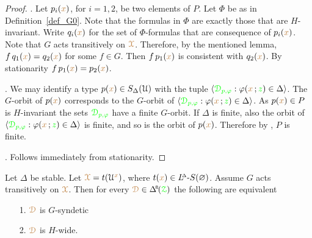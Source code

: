 \begin{proof}
  .
  Let $p_i({\color{brown} x})$, for $i=1,2$, be two elements of $P$.
  Let $\Phi$ be as in Definition~\ref{def_G0}.
  Note that the formulas in $\Phi$ are exactly those that are $H$-invariant.
  Write $q_i({\color{brown} x})$ for the set of $\Phi$-formulas that are consequence of $p_i({\color{brown} x})$.
  Note that $G$ acts transitively on ${\color{brown}\EuScript X}$.
  Therefore, by the mentioned lemma, $f\,q_1({\color{brown} x})=q_2({\color{brown} x})$ for some $f\in G$.
  Then $f\,p_1({\color{brown} x})$ is consistent with $q_2({\color{brown} x})$.
  By stationarity $f\,p_1({\color{brown} x})=p_2({\color{brown} x})$.

  .
  We may identify a type $p({\color{brown} x})\in S_\Delta(\EuScript U)$ with the tuple $\langle{\color{green}\EuScript D_{p,\varphi}}:\varphi({\color{brown} x}\,;{\color{green} z})\in\Delta\rangle$.
  The $G$-orbit of $p({\color{brown} x})$ corresponds to the $G$-orbit of $\langle{\color{green}\EuScript D_{p,\varphi}}:\varphi({\color{brown} x}\,;{\color{green} z})\in\Delta\rangle$.
  As $p({\color{brown} x})\in P$ is $H$-invariant the sets ${\color{green}\EuScript D_{p,\varphi}}$ have a finite $G$-orbit.
  If $\Delta$ is finite, also the orbit of $\langle{\color{green}\EuScript D_{p,\varphi}}:\varphi({\color{brown} x}\,;{\color{green} z})\in\Delta\rangle$ is finite, and so is the orbit of $p({\color{brown} x})$.
  Therefore by , $P$ is finite.

  .
  Follows immediately from stationarity.
\end{proof}

\begin{theorem}\label{thm_Gsyndetic_thick}
  Let $\Delta$ be stable.
  Let ${\color{brown}\EuScript X}=t(\EuScript U^{\color{brown} x})$, where $t({\color{brown} x})\in L\kern-.5ex^{\scriptscriptstyle\Delta}\mbox{-}S(\varnothing)$.
  Assume $G$ acts transitively on ${\color{brown}\EuScript X}$.
  Then for every $\mrD\in\BDelta(\grZ)$ the following are equivalent
  \begin{itemize}
    \item [1.] ${\color{brown}\EuScript D}$ is $G$-syndetic
    \item [2.] ${\color{brown}\EuScript D}$ is $H$-wide.
  \end{itemize}\smallskip
\end{theorem}


